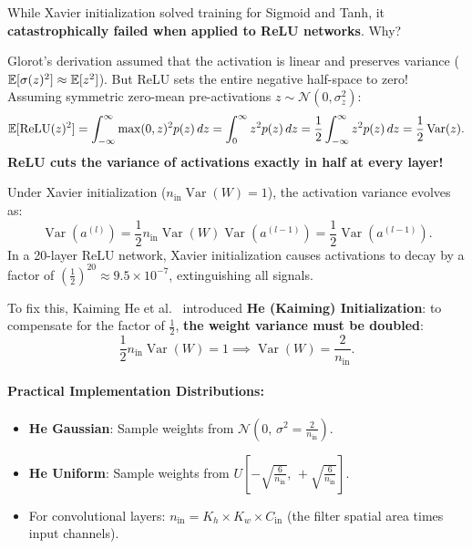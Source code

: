 While Xavier initialization solved training for Sigmoid and Tanh, it \textbf{catastrophically failed when applied to ReLU networks}. Why?

Glorot's derivation assumed that the activation is linear and preserves variance ($\mathbb{E}[\sigma(z)^2] \approx \mathbb{E}[z^2]$). But ReLU sets the entire negative half-space to zero! 
Assuming symmetric zero-mean pre-activations $z \sim \mathcal{N}(0, \sigma_z^2)$:
\begin{equation}
\mathbb{E}[\operatorname{ReLU}(z)^2] = \int_{-\infty}^\infty \max(0, z)^2 p(z) \, dz = \int_0^\infty z^2 p(z) \, dz = \frac{1}{2} \int_{-\infty}^\infty z^2 p(z) \, dz = \frac{1}{2} \operatorname{Var}(z).
\label{eq:relu_halving_variance}
\end{equation}
\textbf{ReLU cuts the variance of activations exactly in half at every layer!} 

Under Xavier initialization ($n_{\text{in}} \operatorname{Var}(W) = 1$), the activation variance evolves as:
\begin{equation}
\operatorname{Var}(a^{(l)}) = \frac{1}{2} n_{\text{in}} \operatorname{Var}(W) \operatorname{Var}(a^{(l-1)}) = \frac{1}{2} \operatorname{Var}(a^{(l-1)}).
\label{eq:xavier_relu_decay}
\end{equation}
In a 20-layer ReLU network, Xavier initialization causes activations to decay by a factor of $\left(\frac{1}{2}\right)^{20} \approx 9.5 \times 10^{-7}$, extinguishing all signals.

To fix this, Kaiming He et al.~\cite{he2015delving} introduced \textbf{He (Kaiming) Initialization}: to compensate for the factor of $\frac{1}{2}$, \textbf{the weight variance must be doubled}:
\begin{equation}
\frac{1}{2} n_{\text{in}} \operatorname{Var}(W) = 1 \implies \operatorname{Var}(W) = \frac{2}{n_{\text{in}}}.
\label{eq:he_init_variance}
\end{equation}

\paragraph{Practical Implementation Distributions:}
\begin{itemize}[noitemsep,topsep=2pt,parsep=0pt,partopsep=0pt]
  \item \textbf{He Gaussian}: Sample weights from $\mathcal{N}\left(0, \, \sigma^2 = \frac{2}{n_{\text{in}}}\right)$.
  \item \textbf{He Uniform}: Sample weights from $U\left[ -\sqrt{\frac{6}{n_{\text{in}}}}, \, +\sqrt{\frac{6}{n_{\text{in}}}} \right]$.
  \item For convolutional layers: $n_{\text{in}} = K_h \times K_w \times C_{\text{in}}$ (the filter spatial area times input channels).
\end{itemize}

